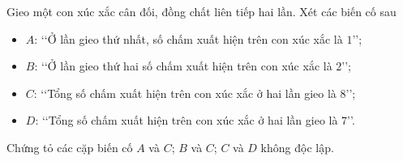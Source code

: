 \begin{bt} %
	Gieo một con xúc xắc cân đối, đồng chất liên tiếp hai lần. Xét các biến cố sau
	\begin{itemize}
	\item $A$: \lq\lq Ở lần gieo thứ nhất, số chấm xuất hiện trên con xúc xắc là $1$\rq\rq;
	\item $B$: \lq\lq Ở lần gieo thứ hai số chấm xuất hiện trên con xúc xắc là $2$\rq\rq;
	\item $C$: \lq\lq Tổng số chấm xuất hiện trên con xúc xắc ở hai lần gieo là $8$\rq\rq;
	\item $D$: \lq\lq Tổng số chấm xuất hiện trên con xúc xắc ở hai lần gieo là $7$\rq\rq.
	\end{itemize}
Chứng tỏ các cặp biến cố $A $ và $C$; $B$ và $C$; $C$ và $D$ không độc lập.
\end{bt}
